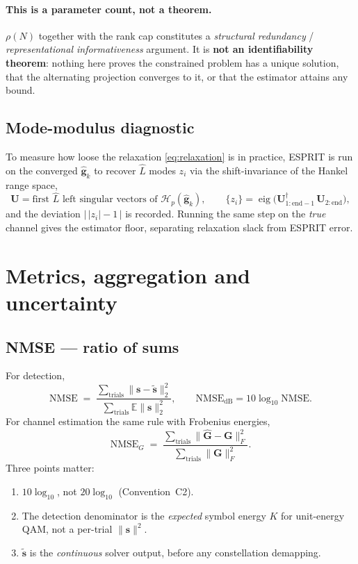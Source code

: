 \documentclass[11pt,a4paper]{article}
\newcommand{\E}{\mathbb{E}}
\newcommand{\mat}[1]{\mathbf{#1}}
\newcommand{\vect}[1]{\mathbf{#1}}
\newcommand{\Hop}{\mathcal{H}}
\newcommand{\NMSE}{\mathrm{NMSE}}
\newcommand{\dB}{\mathrm{dB}}
\begin{document}
\paragraph{This is a parameter count, not a theorem.} $\rho(N)$ together with
the rank cap constitutes a \emph{structural redundancy} /
\emph{representational informativeness} argument. It is \textbf{not an
identifiability theorem}: nothing here proves the constrained problem has a
unique solution, that the alternating projection converges to it, or that the
estimator attains any bound.

\subsection{Mode-modulus diagnostic}
To measure how loose the relaxation \eqref{eq:relaxation} is in practice,
ESPRIT is run on the converged $\hat{\vect{g}}_k$ to recover $\hat L$ modes
$z_i$ via the shift-invariance of the Hankel range space,
\begin{equation}
\mat{U} = \text{first } \hat L \text{ left singular vectors of }\Hop_p(\hat{\vect{g}}_k),
\qquad
\{z_i\} = \operatorname{eig}\bigl(\mat{U}_{1:\text{end}-1}^{\dagger}\,\mat{U}_{2:\text{end}}\bigr),
\label{eq:esprit}
\end{equation}
and the deviation $\bigl|\,|z_i|-1\,\bigr|$ is recorded. Running the same step
on the \emph{true} channel gives the estimator floor, separating relaxation
slack from ESPRIT error.

\section{Metrics, aggregation and uncertainty}\label{sec:metrics}

\subsection{NMSE --- ratio of sums}
For detection,
\begin{equation}
\NMSE \;=\;
\frac{\sum_{\text{trials}}\|\vect{s}-\tilde{\vect{s}}\|_2^2}
     {\sum_{\text{trials}}\E\|\vect{s}\|_2^2},
\qquad
\NMSE_{\dB}=10\log_{10}\NMSE .
\label{eq:nmse}
\end{equation}
For channel estimation the same rule with Frobenius energies,
\begin{equation}
\NMSE_G \;=\;
\frac{\sum_{\text{trials}}\|\hat{\mat{G}}-\mat{G}\|_F^2}
     {\sum_{\text{trials}}\|\mat{G}\|_F^2} .
\label{eq:nmseG}
\end{equation}
Three points matter:
\begin{enumerate}[leftmargin=1.4em,itemsep=1pt]
\item $10\log_{10}$, not $20\log_{10}$ (Convention~C2).
\item The detection denominator is the \emph{expected} symbol energy $K$ for
      unit-energy QAM, not a per-trial $\|\vect{s}\|^2$.
\item $\tilde{\vect{s}}$ is the \emph{continuous} solver output, before any
      constellation demapping.
\end{enumerate}
\end{document}
